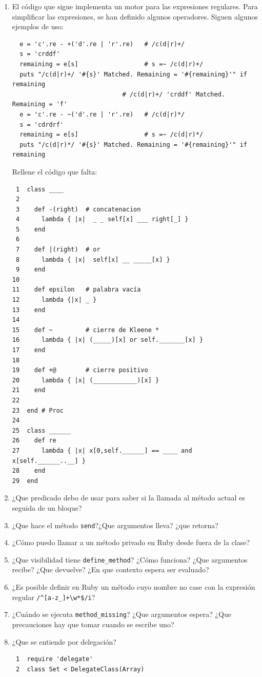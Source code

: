 \begin{enumerate}
\item
El código que sigue implementa un motor para las expresiones regulares.
Para simplificar las expresiones, se han definido algunos operadores.
Siguen algunos ejemplos de uso:
\begin{verbatim}
  e = 'c'.re - +('d'.re | 'r'.re)   # /c(d|r)+/
  s = 'crddf'
  remaining = e[s]                  # s =~ /c(d|r)+/
  puts "/c(d|r)+/ '#{s}' Matched. Remaining = '#{remaining}'" if remaining
                              # /c(d|r)+/ 'crddf' Matched. Remaining = 'f' 
  e = 'c'.re - ~('d'.re | 'r'.re)   # /c(d|r)*/
  s = 'cdrdrf'
  remaining = e[s]                  # s =~ /c(d|r)*/
  puts "/c(d|r)*/ '#{s}' Matched. Remaining = '#{remaining}'" if remaining
\end{verbatim}
Rellene el código que falta:
\begin{verbatim}
 1  class ____
 2  
 3    def -(right)  # concatenacion
 4      lambda { |x|  _ _ self[x] ___ right[_] }
 5    end
 6  
 7    def |(right)  # or
 8      lambda { |x|  self[x] __ _____[x] }
 9    end
10  
11    def epsilon   # palabra vacía
12      lambda {|x| _ }
13    end
14  
15    def ~         # cierre de Kleene *
16      lambda { |x| (_____)[x] or self._______[x] }
17    end
18  
19    def +@        # cierre positivo
20      lambda { |x| (____________)[x] }
21    end
22  
23  end # Proc
24  
25  class ______
26    def re
27      lambda { |x| x[0,self.______] == ____ and x[self.______..__] }
28    end
29  end
\end{verbatim}
\item ¿Que predicado debo de usar para saber si la llamada al método
actual es seguida de un bloque?
\item ¿Que hace el método \verb|send|?¿Que argumentos lleva? ¿que retorna?
\item
¿Cómo puedo llamar a un método privado en Ruby desde fuera de la clase?
\item ¿Que visibilidad tiene \verb|define_method|? ¿Cómo funciona?
¿Que argumentos recibe? ¿Que devuelve? ¿En que contexto espera ser evaluado?
\item ¿Es posible definir en Ruby un método cuyo nombre no case con la expresión
regular \verb|/^[a-z_]+\w*$/i|?
\item ¿Cuándo se ejecuta \verb|method_missing|? ¿Que argumentos espera? ¿Que precauciones hay que tomar 
cuando se escribe uno?
\item ¿Que se entiende por delegación?
\begin{verbatim}
 1  require 'delegate'
 2  class Set < DelegateClass(Array)

\end{verbatim}
\end{enumerate}
